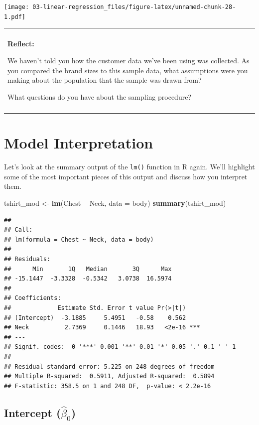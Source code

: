 \documentclass[
]{book}
\newenvironment{Shaded}{\begin{snugshade}}{\end{snugshade}}
\newcommand{\DataTypeTok}[1]{\textcolor[rgb]{0.13,0.29,0.53}{#1}}
\newcommand{\KeywordTok}[1]{\textcolor[rgb]{0.13,0.29,0.53}{\textbf{#1}}}
\newcommand{\NormalTok}[1]{#1}
\newcommand{\OperatorTok}[1]{\textcolor[rgb]{0.81,0.36,0.00}{\textbf{#1}}}
\newcommand{\StringTok}[1]{\textcolor[rgb]{0.31,0.60,0.02}{#1}}
\newenvironment{reflect}
{
    \begin{center}
    
    \begin{tabular}{|p{0.8\textwidth}|}
    \rowcolor{LightBlue}
    \hline\\
    \rowcolor{LightBlue}
    \textbf{Reflect:}
}
{
    \\\rowcolor{LightBlue}
    \\\hline
    \end{tabular} 
    \end{center}
}
\begin{document}
\texttt{[image: 03-linear-regression\_files/figure-latex/unnamed-chunk-28-1.pdf]}

\begin{reflect}
We haven't told you how the customer data we've been using was
collected. As you compared the brand sizes to this sample data, what
assumptions were you making about the population that the sample was
drawn from?

What questions do you have about the sampling procedure?
\end{reflect}

\hypertarget{model-interpretation}{%
\section{Model Interpretation}\label{model-interpretation}}

Let's look at the summary output of the \texttt{lm()} function in R again. We'll highlight some of the most important pieces of this output and discuss how you interpret them.

\begin{Shaded}
\begin{Highlighting}[]
\NormalTok{tshirt_mod <-}\StringTok{ }\KeywordTok{lm}\NormalTok{(Chest }\OperatorTok{~}\StringTok{ }\NormalTok{Neck, }\DataTypeTok{data =}\NormalTok{ body)}
\KeywordTok{summary}\NormalTok{(tshirt_mod)}
\end{Highlighting}
\end{Shaded}

\begin{verbatim}
## 
## Call:
## lm(formula = Chest ~ Neck, data = body)
## 
## Residuals:
##      Min       1Q   Median       3Q      Max 
## -15.1447  -3.3328  -0.5342   3.0738  16.5974 
## 
## Coefficients:
##             Estimate Std. Error t value Pr(>|t|)    
## (Intercept)  -3.1885     5.4951   -0.58    0.562    
## Neck          2.7369     0.1446   18.93   <2e-16 ***
## ---
## Signif. codes:  0 '***' 0.001 '**' 0.01 '*' 0.05 '.' 0.1 ' ' 1
## 
## Residual standard error: 5.225 on 248 degrees of freedom
## Multiple R-squared:  0.5911,	Adjusted R-squared:  0.5894 
## F-statistic: 358.5 on 1 and 248 DF,  p-value: < 2.2e-16
\end{verbatim}

\hypertarget{intercept-hatbeta_0}{%
\subsection{\texorpdfstring{Intercept (\(\hat{\beta}_0\))}{Intercept (\textbackslash hat\{\textbackslash beta\}\_0)}}\label{intercept-hatbeta_0}}
\end{document}
